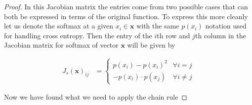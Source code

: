 \documentclass[11pt]{article}
\newcommand{\bs}{\boldsymbol}
\begin{document}
\begin{proof}
	In this Jacobian matrix the entries come from two possible
	cases that can both be expressed in terms of the original function. To express
	this more cleanly let us denote the softmax at a given $x_i \in \bs{x}$
	with the same $p(x_i)$ notation used for handling cross entropy.
	Then the entry of the $i$th row and $j$th column in the Jacobian matrix for
	softmax of vector $\bs{x}$ will be given by

	\begin{align}
		J_s(\bs{x})_{i j} &= \begin{cases}
			p(x_i) - p(x_i)^2 & \forall i=j \\
			- p(x_i) \cdot p(x_j) & \forall i\neq j
		\end{cases}
	\end{align}

	Now we have found what we need to apply the chain rule


\end{proof}
\end{document}

